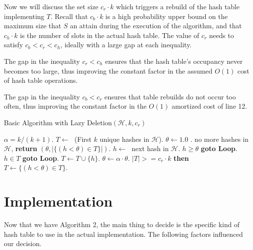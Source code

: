 \documentclass{sig-alternate}
\begin{document}
Now we will discuss the set size $c_r \cdot k$ which triggers a rebuild of the hash table implementing $T$.
Recall that $c_b \cdot k$ is a high probability upper bound on the maximum size that $S$ an attain during the 
execution of the algorithm, and that $c_h \cdot k$ is the number of slots in the actual hash table. The value
of $c_r$ needs to satisfy $c_b < c_r < c_h$, ideally with a large gap at each inequality.

The gap in the inequality $c_r < c_h$ ensures that the hash table's occupancy never becomes too large,
thus improving the constant factor in the assumed $O(1)$ cost of hash table operations.

The gap in the inequality $c_b < c_r$ ensures that table rebuilds do not occur too often, thus improving the constant
factor in the $O(1)$ amortized cost of line 12.

\begin{algorithm}[t]
\caption{Basic Algorithm with Lazy Deletion$(\mathcal{H},k,c_r)$}
\label{alg:basic-algo-lazy}
\begin{algorithmic}[1]{\footnotesize
\STATE $\alpha = k/(k+1)$.
\STATE $T \leftarrow\;$ (First $k$ unique hashes in $\mathcal{H}$).
\STATE $ \theta \leftarrow 1.0 $
\STATE {}.
 no more hashes in $\mathcal{H}$, {\bf return} $(\theta,|\{(h < \theta) \in T\}|)$.
\STATE $h \leftarrow\;$ next hash in $\mathcal{H}$.
 $h \ge \theta$ {\bf goto Loop}.
 $h \in T$ {\bf goto Loop}.
\STATE $T \leftarrow T \cup \{h\}$.
\STATE $\theta \leftarrow \alpha \cdot \theta$.
 $|T| >= c_r \cdot k$ {\bf then} $T \leftarrow \{(h < \theta) \in T\}$.
}\end{algorithmic}
\end{algorithm}

\section{Implementation}

Now that we have Algorithm 2, the main thing to decide is the specific kind of hash table
to use in the actual implementation. The following factors influenced our decision.
\end{document}
